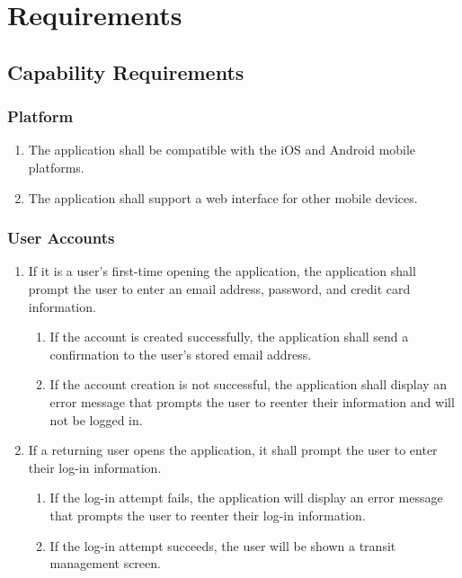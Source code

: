 \section{Requirements}
\subsection{Capability Requirements}

	\subsubsection{Platform}\begin{enumerate}
		\item The application shall be compatible with the iOS and Android mobile platforms.
		\item The application shall support a web interface for other mobile devices.
	\end{enumerate}
	
	\subsubsection{User Accounts}\begin{enumerate}
		\item If it is a user’s first-time opening the application, the application shall prompt the user to enter an email address, password, and credit card information.
		\begin{enumerate}
			\item If the account is created successfully, the application shall send a confirmation to the user’s stored email address.
			\item If the account creation is not successful, the application shall display an error message that prompts the user to reenter their information and will not be logged in.
		\end{enumerate}
		\item If a returning user opens the application, it shall prompt the user to enter their log-in information.
			\begin{enumerate}
				\item If the log-in attempt fails, the application will display an error message that prompts the user to reenter their log-in information.
				\item If the log-in attempt succeeds, the user will be shown a transit management screen.
			\end{enumerate}
	\end{enumerate}
	
